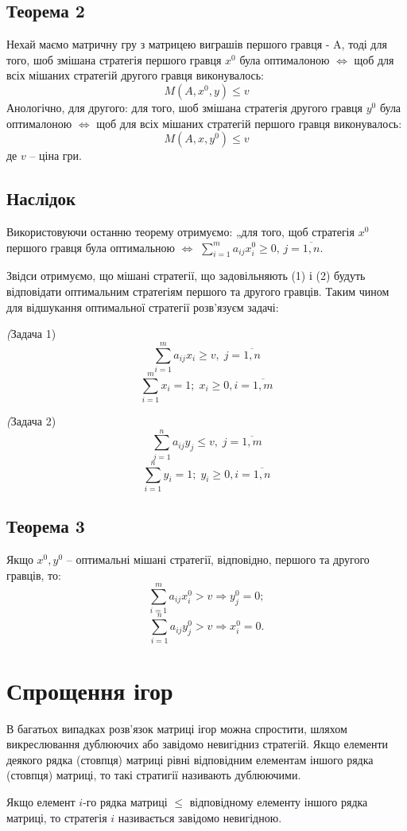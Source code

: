\documentclass[12pt,a4paper]{book}
\begin{document}
\subsection{Теорема 2}
Нехай маємо матричну гру з матрицею виграшів першого гравця - A, тоді для того, шоб змішана стратегія першого гравця $x^0$ була оптималоною $\iff$ щоб для всіх мішаних стратегій другого гравця виконувалось:
\[M(A,x^0,y)\le v\]
Анологічно, для другого: для того, шоб змішана стратегія другого гравця $y^0$ була оптималоною $\iff$ щоб для всіх мішаних стратегій першого гравця виконувалось:
\[M(A,x,y^0)\le v\]
 де $v$ -- ціна гри.
\subsection{Наслідок}
Використовуючи останню теорему отримуємо: „для того, щоб стратегія $x^0$ першого гравця була оптимальною $\iff$ $\sum_{i=1}^m a_{ij} x_i^0 \ge 0, \, j=\overline{1, n}$.

Звідси отримуємо, що мішані стратегії, що задовільняють (1) і (2) будуть відповідати оптимальним стратегіям першого та другого гравців. Таким чином для відшукання оптимальної стратегії розв'язуєм задачі:

\emph(Задача 1)
\[\sum_{i=1}^m a_{ij}x_i \ge v, \; j=\overline{1, n}\]
\[\sum_{i=1}^m x_i = 1; \; x_i \ge 0, i =\overline{1, m} \]

\emph(Задача 2)
\[\sum_{j=1}^n a_{ij}y_j \le v, \; j=\overline{1, m}\]
\[\sum_{i=1}^n y_i = 1; \; y_i \ge 0, i =\overline{1, n} \]
\subsection{Теорема 3}
Якщо $x^0, y^0$ -- оптимальні мішані стратегії, відповідно, першого та другого гравців, то:
\[\sum_{i=1}^m a_{ij} x_i^0 > v \Rightarrow y_j^0 = 0;\]
\[\sum_{i=1}^n a_{ij} y_j^0 > v \Rightarrow x_i^0 = 0.\]
\section{Спрощення ігор}

В багатьох випадках розв'язок матриці ігор можна спростити, шляхом викреслювання дублюючих або завідомо невигідниз стратегій. Якщо елементи деякого рядка (стовпця) матриці рівні відповідним елементам іншого рядка (стовпця) матриці, то такі стратигії називають дублюючими.

Якщо елемент $i$-го рядка матриці $\le$ відповідному елементу іншого рядка матриці, то стратегія $i$ називається завідомо невигідною.
\end{document}
